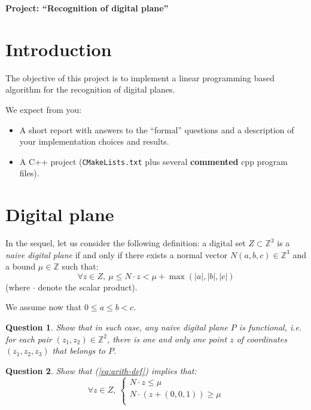 \documentclass[a4paper, 11pt]{article}
\title{}
\author{}
\date{}
\newtheorem{qu}{Question}
\begin{document}
\begin{center}
	\LARGE \textbf{Project: ``Recognition of digital plane''}
\end{center}

\section*{Introduction}

The objective of this project is to implement a linear programming based algorithm
for the recognition of digital planes. 

We expect from you:
\begin{itemize}
\item A short report with answers to the ``formal'' questions and a
  description of your implementation choices and results.
\item A C++ project (\texttt{CMakeLists.txt} plus several
  \textbf{commented} cpp program files).
\end{itemize}


\section{Digital plane}

In the sequel, let us consider the following definition: 
a digital set $Z \subset \mathbb{Z}^3$ is a \emph{naive digital plane} if and only if 
there exists a normal vector $N(a,b,c) \in \mathbb{Z}^3$ and 
a bound $\mu \in \mathbb{Z}$ such that:
\begin{equation}
\label{eq:arith-def}
    \forall z \in Z, \: \mu \leq N \cdot z < \mu + \max{(|a|,|b|,|c|)}
\end{equation}
(where $\cdot$ denote the scalar product). 

We assume now that $0 \leq a \leq b < c$.

\begin{qu}
Show that in such case, any naive digital plane $P$ is functional, i.e. 
for each pair $(z_1, z_2) \in \mathbb{Z}^2$, there is one and only one
 point $z$ of coordinates $(z_1,z_2,z_3)$ that belongs to $P$. 
\end{qu}

\begin{qu}
Show that (\ref{eq:arith-def}) implies that: 
\begin{equation}
\label{eq:separ-def}
\forall z \in Z, \:
  \left\{
  \begin{array}{l}
     N \cdot z \leq \mu  \\
     N \cdot (z+(0,0,1)) \geq \mu  \\
  \end{array}
  \right.
\end{equation} 
\end{qu}
\end{document}
